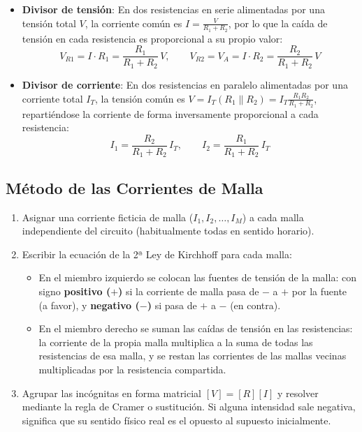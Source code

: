 \begin{itemize}
    \item \textbf{Divisor de tensión}: En dos resistencias en serie alimentadas por una tensión total $V$, la corriente común es $I = \frac{V}{R_1 + R_2}$, por lo que la caída de tensión en cada resistencia es proporcional a su propio valor:
    \begin{equation}
        V_{R1} = I\cdot R_1 = \frac{R_1}{R_1 + R_2}\,V, \qquad V_{R2} = V_A = I\cdot R_2 = \frac{R_2}{R_1 + R_2}\,V
    \end{equation}
    \item \textbf{Divisor de corriente}: En dos resistencias en paralelo alimentadas por una corriente total $I_T$, la tensión común es $V = I_T (R_1 \parallel R_2) = I_T \frac{R_1 R_2}{R_1 + R_2}$, repartiéndose la corriente de forma inversamente proporcional a cada resistencia:
    \begin{equation}
        I_1 = \frac{R_2}{R_1 + R_2}\,I_T, \qquad I_2 = \frac{R_1}{R_1 + R_2}\,I_T
    \end{equation}
\end{itemize}

\subsection{Método de las Corrientes de Malla}

\begin{metodo}
\begin{enumerate}
    \item Asignar una corriente ficticia de malla ($I_1, I_2, \dots, I_M$) a cada malla independiente del circuito (habitualmente todas en sentido horario).
    \item Escribir la ecuación de la 2ª Ley de Kirchhoff para cada malla:
    \begin{itemize}
        \item En el miembro izquierdo se colocan las fuentes de tensión de la malla: con signo \textbf{positivo ($+$)} si la corriente de malla pasa de $-$ a $+$ por la fuente (a favor), y \textbf{negativo ($-$)} si pasa de $+$ a $-$ (en contra).
        \item En el miembro derecho se suman las caídas de tensión en las resistencias: la corriente de la propia malla multiplica a la suma de todas las resistencias de esa malla, y se restan las corrientes de las mallas vecinas multiplicadas por la resistencia compartida.
    \end{itemize}
    \item Agrupar las incógnitas en forma matricial $[V] = [R][I]$ y resolver mediante la regla de Cramer o sustitución. Si alguna intensidad sale negativa, significa que su sentido físico real es el opuesto al supuesto inicialmente.
\end{enumerate}
\end{metodo}

